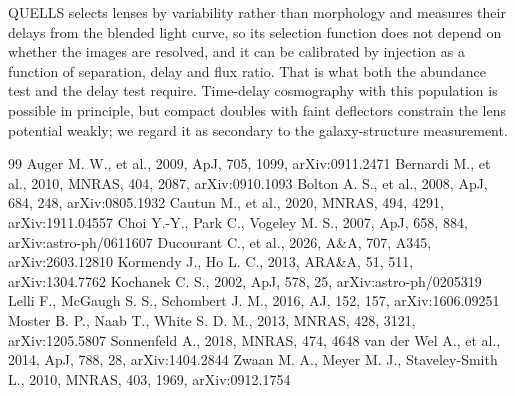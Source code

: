 \documentclass[11pt,a4paper]{article}
\begin{document}
QUELLS selects lenses by variability rather than morphology and measures their delays from the blended light curve, so its selection function does not depend on whether the images are resolved, and it can be calibrated by injection as a function of separation, delay and flux ratio. That is what both the abundance test and the delay test require. Time-delay cosmography with this population is possible in principle, but compact doubles with faint deflectors constrain the lens potential weakly; we regard it as secondary to the galaxy-structure measurement.

\begin{thebibliography}{99}
 Auger M. W., et al., 2009, ApJ, 705, 1099, arXiv:0911.2471
 Bernardi M., et al., 2010, MNRAS, 404, 2087, arXiv:0910.1093
 Bolton A. S., et al., 2008, ApJ, 684, 248, arXiv:0805.1932
 Cautun M., et al., 2020, MNRAS, 494, 4291, arXiv:1911.04557
 Choi Y.-Y., Park C., Vogeley M. S., 2007, ApJ, 658, 884, arXiv:astro-ph/0611607
 Ducourant C., et al., 2026, A\&A, 707, A345, arXiv:2603.12810
 Kormendy J., Ho L. C., 2013, ARA\&A, 51, 511, arXiv:1304.7762
 Kochanek C. S., 2002, ApJ, 578, 25, arXiv:astro-ph/0205319
 Lelli F., McGaugh S. S., Schombert J. M., 2016, AJ, 152, 157, arXiv:1606.09251
 Moster B. P., Naab T., White S. D. M., 2013, MNRAS, 428, 3121, arXiv:1205.5807
 Sonnenfeld A., 2018, MNRAS, 474, 4648
 van der Wel A., et al., 2014, ApJ, 788, 28, arXiv:1404.2844
 Zwaan M. A., Meyer M. J., Staveley-Smith L., 2010, MNRAS, 403, 1969, arXiv:0912.1754
\end{thebibliography}
\end{document}
